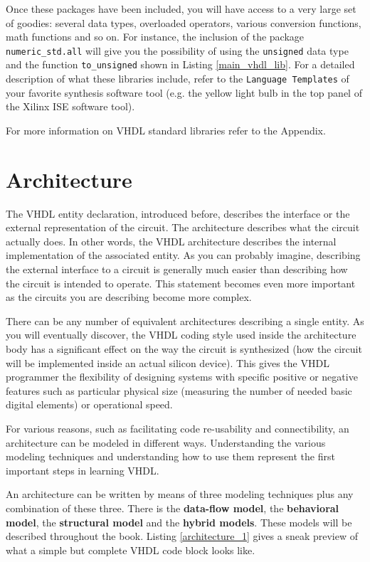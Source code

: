 Once these packages have been included, you will have access to a very large set of goodies: several data types, overloaded operators, various conversion functions, math functions and so on. For instance, the inclusion of the package \texttt{numeric\_std.all} will give you the possibility of using the \texttt{unsigned} data type and the function \texttt{to\_unsigned} shown in Listing \ref{main_vhdl_lib}. For a detailed description of what these libraries include, refer to the \texttt{Language Templates} of your favorite synthesis software tool (e.g. the yellow light bulb in the top panel of the Xilinx ISE software tool).

For more information on VHDL standard libraries refer to the Appendix.

\section{Architecture}
The VHDL entity declaration, introduced before, describes the interface or the external representation of the circuit. The architecture describes what the circuit actually does. In other words, the VHDL architecture describes the internal implementation of the associated entity. As you can probably imagine, describing the external interface to a circuit is generally much easier than describing how the circuit is intended to operate. This statement becomes even more important as the circuits you are describing become more complex.

There can be any number of equivalent architectures describing a single entity. As you will eventually discover, the VHDL coding style used inside the architecture body has a significant effect on the way the circuit is synthesized (how the circuit will be implemented inside an actual silicon device). This gives the VHDL programmer the flexibility of designing systems with specific positive or negative features such as particular physical size (measuring the number of needed basic digital elements) or operational speed.

For various reasons, such as facilitating code re-usability and connectibility, an architecture can be modeled in different ways. Understanding the various modeling techniques and understanding how to use them represent the first important steps in learning VHDL.

An architecture can be written by means of three modeling techniques plus any combination of these three. There is the \textbf{data-flow model}, the \textbf{behavioral model}, the \textbf{structural model} and the \textbf{hybrid models}. These models will be described throughout the book. Listing \ref{architecture_1} gives a sneak preview of what a simple but complete VHDL code block looks like.

